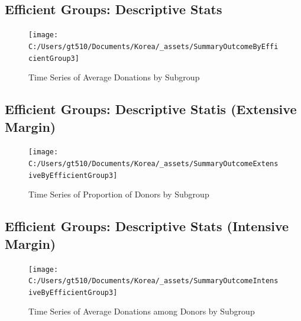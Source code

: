 \documentclass[ review  , 3p ]{elsarticle}
\begin{document}
  \hypertarget{efficient-groups-descriptive-stats}{%
  \subsection{Efficient Groups: Descriptive Stats}\label{efficient-groups-descriptive-stats}}
  
  \begin{figure}
  
  {\centering \texttt{[image: C:/Users/gt510/Documents/Korea/\_assets/SummaryOutcomeByEfficientGroup3]} 
  
  }
  
  \caption{Time Series of Average Donations by Subgroup}\label{fig:unnamed-chunk-7}
  \end{figure}
  
  \hypertarget{efficient-groups-descriptive-statis-extensive-margin}{%
  \subsection{Efficient Groups: Descriptive Statis (Extensive Margin)}\label{efficient-groups-descriptive-statis-extensive-margin}}
  
  \begin{figure}
  
  {\centering \texttt{[image: C:/Users/gt510/Documents/Korea/\_assets/SummaryOutcomeExtensiveByEfficientGroup3]} 
  
  }
  
  \caption{Time Series of Proportion of Donors by Subgroup}\label{fig:unnamed-chunk-8}
  \end{figure}
  
  \hypertarget{efficient-groups-descriptive-stats-intensive-margin}{%
  \subsection{Efficient Groups: Descriptive Stats (Intensive Margin)}\label{efficient-groups-descriptive-stats-intensive-margin}}
  
  \begin{figure}
  
  {\centering \texttt{[image: C:/Users/gt510/Documents/Korea/\_assets/SummaryOutcomeIntensiveByEfficientGroup3]} 
  
  }
  
  \caption{Time Series of Average Donations among Donors by Subgroup}\label{fig:unnamed-chunk-9}
  \end{figure}
  
\end{document}
